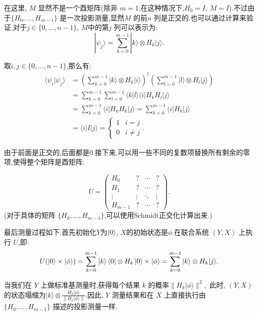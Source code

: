 在这里, $M$ 显然不是一个酉矩阵(除非 $m=1$,在这种情况下,$H_0 = I,~M=I$).不过由于$\{H_0, \ldots, H_{m-1}\}$ 是一次投影测量,显然$M$ 的前$n$ 列是正交的.也可以通过计算来验证,对于$j \in \{0, \ldots, n-1\}$, $M$中的第$j$ 列可以表示为:
\begin{equation}
|\psi_j\rangle  = \sum_{k=0}^{m-1} |k\rangle \otimes H_k |j\rangle.
\end{equation}

取$i, j \in \{0, \ldots, n-1\}$,那么有:
\begin{align*}
\langle \psi_i | \psi_j \rangle 
&= \left(\sum_{k=0}^{m-1} |k\rangle \otimes H_k |i\rangle\right)^\dagger \left(\sum_{l=0}^{m-1} |l\rangle \otimes H_l |j\rangle\right) \\
&= \sum_{k=0}^{m-1} \sum_{l=0}^{m-1} \langle k|l\rangle \langle i| H_k H_l |j\rangle \\
&= \sum_{k=0}^{m-1} \langle i| H_k H_k |j\rangle = \sum_{k=0}^{m-1} \langle i| H_k |j\rangle \\
&= \langle i| I |j\rangle = \begin{cases} 1 & i=j \\ 0 & i \neq j \end{cases}.
\end{align*}

由于前面是正交的,后面都是0.接下来,可以用一些不同的复数项替换所有剩余的零项,使得整个矩阵是酉矩阵:

\begin{equation}
U = \begin{pmatrix}
	H_0 & ? & \cdots & ? \\
	H_1 & ? & \cdots & ? \\
	\vdots & \vdots & \ddots & \vdots \\
	H_{m-1} & ? & \cdots & ?
\end{pmatrix}.
\end{equation}
(对于具体的矩阵 $\{H_0, \ldots, H_{m-1}\}$,可以使用Schmidt正交化计算出来.)

最后测量过程如下:首先初始化$Y$为$\ket{0}$, $X$的初始状态是$\phi$.在联合系统 $(Y, X)$ 上执行 $U$,即:
\begin{equation}
U(\ket{0}\times\ket{\phi})=\sum_{k=0}^{m-1} \ket{k}\bra{0} \otimes H_k\ket{0}\times\ket{\phi}= \sum_{k=0}^{m-1} |k\rangle \otimes H_k |j\rangle.
\end{equation}

当我们在 $Y$ 上做标准基测量时,获得每个结果 $k$ 的概率$\|H_k |\phi\rangle\|^2,$ 此时, $(Y, X)$ 的状态塌缩为$|k\rangle \otimes \frac{H_k |\phi\rangle}{\|H_k |\phi\rangle\|}.$因此, $Y$ 测量结果和在 $X$ 上直接执行由 $\{H_0, \ldots, H_{m-1}\}$ 描述的投影测量一样.




